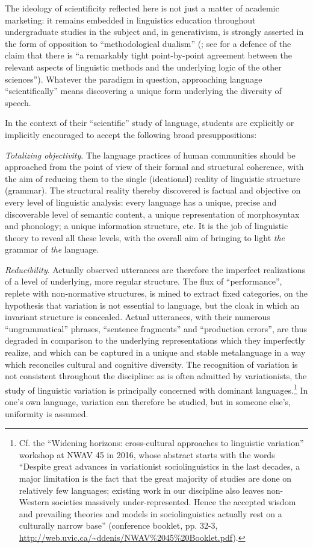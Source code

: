 \documentclass[output=paper]{langscibook}
\begin{document}
The ideology of scientificity reflected here is not just a matter of academic marketing: it remains embedded in linguistics education throughout undergraduate studies in the subject and, in generativism, is strongly asserted in the form of opposition to ``methodological dualism'' (\citealt{Chomsky1995}; see \citealt[367]{Johnson2007} for a defence of the claim that there is ``a remarkably tight point-by-point agreement between the relevant aspects of linguistic methods and the underlying logic of the other sciences''). Whatever the paradigm in question, approaching language ``scientifically'' means discovering a unique form underlying the diversity of speech.

In the context of their ``scientific'' study of language, students are explicitly or implicitly encouraged to accept the following broad presuppositions:

\emph{Totalizing objectivity}. The language practices of human communities should be approached from the point of view of their formal and structural coherence, with the aim of reducing them to the single (ideational) reality of linguistic structure (grammar). The structural reality thereby discovered is factual and objective on every level of linguistic analysis: every language has a unique, precise and discoverable level of semantic content, a unique representation of morphosyntax and phonology; a unique information structure, etc. It is the job of linguistic theory to reveal all these levels, with the overall aim of bringing to light \emph{the} grammar of \emph{the} language.

\emph{Reducibility}. Actually observed utterances are therefore the imperfect realizations of a level of underlying, more regular structure. The flux of ``performance'', replete with non-normative structures, is mined to extract fixed categories, on the hypothesis that variation is not essential to language, but the cloak in which an invariant structure is concealed. Actual utterances, with their numerous ``ungrammatical'' phrases, ``sentence fragments'' and ``production errors'', are thus degraded in comparison to the underlying representations which they imperfectly realize, and which can be captured in a unique and stable metalanguage in a way which reconciles cultural and cognitive diversity. The recognition of variation is not consistent throughout the discipline: as is often admitted by variationists, the study of linguistic variation is principally concerned with dominant languages.\footnote{Cf. the ``Widening horizons: cross-cultural approaches to linguistic variation'' workshop at NWAV 45 in 2016, whose abstract starts with the words ``Despite great advances in variationist sociolinguistics in the last decades, a major limitation is the fact that the great majority of studies are done on relatively few languages; existing work in our discipline also leaves non-Western societies massively under-represented. Hence the accepted wisdom and prevailing theories and models in sociolinguistics actually rest on a culturally narrow base'' (conference booklet, pp. 32-3, \url{http://web.uvic.ca/~ddenis/NWAV\%2045\%20Booklet.pdf}).} In one's own language, variation can therefore be studied, but in someone else's, uniformity is assumed.
\end{document}
